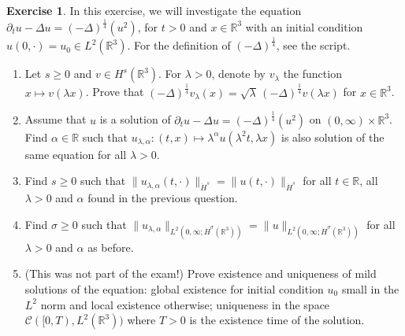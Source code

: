 \documentclass[a4paper, 12pt]{article}
\theoremstyle{plain}
\theoremstyle{definition}
\newtheorem{exercise}{Exercise}
\theoremstyle{remark}
\numberwithin{equation}{section}
\begin{document}
\begin{exercise}
In this exercise, we will investigate the equation $\partial_tu-\Delta u=(-\Delta)^{\frac{1}{4}}(u^2)$, for $t>0$ and $x\in{\mathds{R}}^3$
with an initial condition $u(0,\cdot)=u_0\in L^2({\mathds{R}}^3)$. For the definition of $(-\Delta)^{\frac{1}{4}}$, see the script.
%
\begin{enumerate}
\item 
Let $s\ge 0$ and $v\in H^s({\mathds{R}}^3)$. For $\lambda >0$, denote by $v_\lambda$ the function $x\mapsto v(\lambda x)$.
Prove that $(-\Delta)^{\frac{1}{4}}v_\lambda(x)=\sqrt{\lambda} \, (-\Delta)^{\frac{1}{4}}v (\lambda x)$ for $x\in {\mathds{R}}^3$.
\item 
Assume that $u$ is a solution of $\partial_tu-\Delta u=(-\Delta)^{\frac{1}{4}}(u^2)$ on $(0,\infty)\times {\mathds{R}}^3$. Find $\alpha\in{\mathds{R}}$
such that $u_{\lambda,\alpha}:(t,x)\mapsto \lambda^\alpha u(\lambda^2t,\lambda x)$ is also solution of the same equation for all $\lambda>0$.
\item 
Find $s\ge 0$ such that $\|u_{\lambda,\alpha}(t,\cdot)\|_{\dot H^s}=\|u(t,\cdot)\|_{\dot H^s}$ for all $t\in {\mathds{R}}$, all
$\lambda >0$ and $\alpha$ found in the previous question.
\item
Find $\sigma\ge 0$ such that 
$\|u_{\lambda,\alpha}\|_{L^2(0,\infty;\dot H^{\sigma}({\mathds{R}}^3))}=\|u\|_{L^2(0,\infty;\dot H^{\sigma}({\mathds{R}}^3))}$ for all 
$\lambda >0$ and $\alpha$ as before.
\item (This was not part of the exam!)
Prove existence and uniqueness of mild solutions of the equation: global existence for initial condition $u_0$ small in the $L^2$ norm and 
local existence otherwise; uniqueness in the space ${\mathscr{C}}([0,T),L^2({\mathds{R}}^3))$ where $T>0$ is the existence time of the solution.
\end{enumerate}
\end{exercise}
\end{document}
